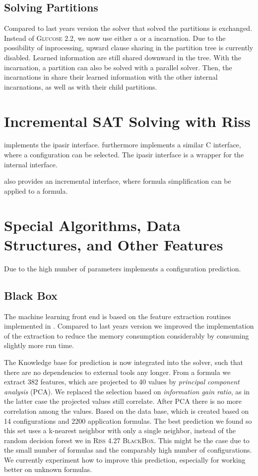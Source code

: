 \documentclass[conference]{IEEEtran}
\begin{document}
\subsection{Solving Partitions}

Compared to last years version the solver that solved the partitions is exchanged. 
Instead of \textsc{Glucose 2.2}, we now use either a \riss or a \priss incarnation. 
Due to the possibility of inprocessing, upward clause sharing in the partition tree is currently disabled. 
Learned information are still shared downward in the tree. 
With the \priss incarnation, a partition can also be solved with a parallel solver. 
Then, the incarnations in \priss share their learned information with the other internal incarnations, as well as with their child partitions.

\section{Incremental SAT Solving with Riss}

\riss implements the ipasir interface. 
\riss furthermore implements a similar C interface, where a configuration can be selected. 
The ipasir interface is a wrapper for the internal interface. 

\coprocessor also provides an incremental interface, where formula simplification can be applied to a formula.

\section{Special Algorithms, Data Structures, and Other Features}

Due to the high number of parameters \riss implements a configuration prediction. 

\subsection{Black Box}

The machine learning front end is based on the feature extraction routines implemented in \riss. 
Compared to last years version we improved the implementation of the extraction to reduce the memory consumption considerably by consuming slightly more run time. 

The Knowledge base for prediction is now integrated into the solver, such that there are no dependencies to external tools any longer. 
From a formula we extract 382 features, which are projected to 40 values by \emph{principal component analysis} (PCA). 
We replaced the selection based on \emph{information gain ratio}, as in the latter case the projected values still correlate. 
After PCA there is no more correlation among the values. 
Based on the data base, which is created based on 14 configurations and 2200 application formulas. 
The best prediction we found so this set uses a k-nearest neighbor with only a single neighbor, instead of the random decision forest we in \textsc{Riss 4.27 BlackBox}.  
This might be the case due to the small number of formulas and the comparably high number of configurations. 
We currently experiment how to improve this prediction, especially for working better on unknown formulas. 
\end{document}
